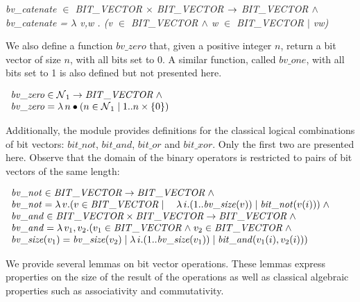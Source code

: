 \documentclass[11pt]{article} %
\begin{document}
\hspace*{0.00in} \it bv\_catenate  $\in$  \it BIT\_VECTOR  $\times$  \it BIT\_VECTOR  $\rightarrow$ \it
BIT\_VECTOR $\land$\\
\hspace*{0.00in} \it bv\_catenate \rm =  $\lambda$  v\rm ,\it w \rm . \rm (\it v 
$\in$  \it BIT\_VECTOR $\land$ \it w $\in$  \it BIT\_VECTOR  $\mid$  \it v\^ \it w\rm ) %


We also define a function $\mathit{bv\_zero}$ that, given a positive
integer $n$, return a bit vector of size $n$, with all bits set to 0.
A similar function, called $\mathit{bv\_one}$, with all bits set to 1
is also defined but not presented here.

$
\begin{array}{l}
\mathit{bv\_zero} \in \nat_1 \fun \mathit{BIT\_VECTOR} \land \\
\mathit{bv\_zero} = \lambda n \bullet (n \in \nat_1 \mid 1..n \times \{0\}) 
\end{array}
$



Additionally, the module provides definitions for the classical
logical combinations of bit vectors: $\mathit{bit\_not}$,
$\mathit{bit\_and}$, $\mathit{bit\_or}$ and $\mathit{bit\_xor}$. Only
the first two are presented here. Observe that the domain of the
binary operators is restricted to pairs of bit vectors of the same
length:

$
\begin{array}{l}
\mathit{bv\_not} \in \mathit{BIT\_VECTOR} \fun \mathit{BIT\_VECTOR} \land \\
\mathit{bv\_not} = \lambda v . (v \in \mathit{BIT\_VECTOR} \mid \quad \lambda i . (1 .. \mathit{bv\_size}(v)) \mid \mathit{bit\_not}(v(i))) \land \\
\mathit{bv\_and} \in \mathit{BIT\_VECTOR} \times \mathit{BIT\_VECTOR} \fun \mathit{BIT\_VECTOR} \land \\
\mathit{bv\_and} = \lambda v_1, v_2 . (v_1 \in \mathit{BIT\_VECTOR} \land v_2 \in \mathit{BIT\_VECTOR} \land \\
\mathit{bv\_size}(v_1) = \mathit{bv\_size}(v_2) \mid \lambda i . (1 .. \mathit{bv\_size}(v_1)) \mid
\mathit{bit\_and}(v_1(i), v_2(i)))
\end{array}
$

We provide several lemmas on bit vector operations. These lemmas
express properties on the size of the result of the operations
as well as classical algebraic properties such as associativity
and commutativity.
\end{document}
